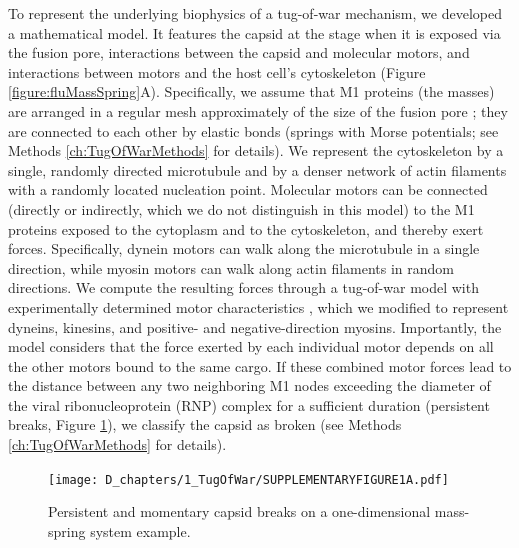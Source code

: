 To represent the underlying biophysics of a tug-of-war mechanism, we developed a mathematical model. It features the capsid at the stage when it is exposed via the fusion pore, interactions between the capsid and molecular motors, and interactions between motors and the host cell’s cytoskeleton (Figure \ref{figure:fluMassSpring}A). Specifically, we assume that M1 proteins (the masses) are arranged in a regular mesh approximately of the size of the fusion pore \cite{hilsch2014influenza}; they are connected to each other by elastic bonds (springs with Morse potentials; see Methods \ref{ch:TugOfWarMethods} for details). We represent the cytoskeleton by a single, randomly directed microtubule and by a denser network of actin filaments with a randomly located nucleation point. Molecular motors can be connected (directly or indirectly, which we do not distinguish in this model) to the M1 proteins exposed to the cytoplasm and to the cytoskeleton, and thereby exert forces. Specifically, dynein motors can walk along the microtubule in a single direction, while myosin motors can walk along actin filaments in random directions. We compute the resulting forces through a tug-of-war model with experimentally determined motor characteristics \cite{gennerich2007force, muller2008tug, norstrom2010unconventional}, which we modified to represent dyneins, kinesins, and positive- and negative-direction myosins. Importantly, the model considers that the force exerted by each individual motor depends on all the other motors bound to the same cargo. If these combined motor forces lead to the distance between any two neighboring M1 nodes exceeding the diameter of the viral ribonucleoprotein (RNP) complex for a sufficient duration (persistent breaks, Figure \ref{figure:PersistentBreaks}), we classify the capsid as broken (see Methods \ref{ch:TugOfWarMethods} for details).

\begin{figure}
\begin{center}
\texttt{[image: D\_chapters/1\_TugOfWar/SUPPLEMENTARYFIGURE1A.pdf]}
\caption[Persistent and momentary capsid breaks]%
{Persistent and momentary capsid breaks on a one-dimensional mass-spring system example.}
\label{figure:PersistentBreaks}
\end{center}
\end{figure}

